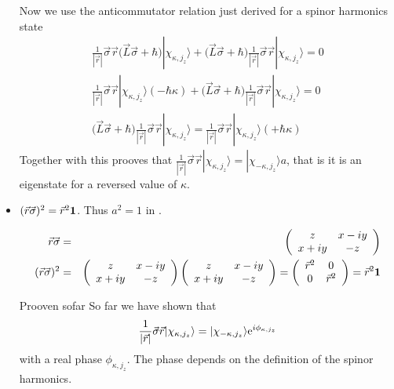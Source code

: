 \documentclass[11pt,a4paper]{report}
\begin{document}
\begin{itemize}
Now we use the anticommutator relation just derived for a spinor
harmonics state
\begin{eqnarray*}
\frac{1}{|\vec{r}|}\vec{\sigma}\vec{r}\biggl(\vec{L}\vec{\sigma}+\hbar\biggr)
|\chi_{\kappa,j_z}\rangle
+\biggl(\vec{L}\vec{\sigma}+\hbar\biggr)\frac{1}{|\vec{r}|}\vec{\sigma}\vec{r}
|\chi_{\kappa,j_z}\rangle
=0
\\
\frac{1}{|\vec{r}|}\vec{\sigma}\vec{r}
|\chi_{\kappa,j_z}\rangle\left(-\hbar\kappa\right)
+\biggl(\vec{L}\vec{\sigma}+\hbar\biggr)\frac{1}{|\vec{r}|}\vec{\sigma}\vec{r}
|\chi_{\kappa,j_z}\rangle
=0
\\
\biggl(\vec{L}\vec{\sigma}+\hbar\biggr)\frac{1}{|\vec{r}|}\vec{\sigma}\vec{r}
|\chi_{\kappa,j_z}\rangle
=\frac{1}{|\vec{r}|}\vec{\sigma}\vec{r}
|\chi_{\kappa,j_z}\rangle\left(+\hbar\kappa\right)
\end{eqnarray*}
Together with  this prooves that
$\frac{1}{|\vec{r}|}\vec{\sigma}\vec{r}
|\chi_{\kappa,j_z}\rangle=|\chi_{-\kappa,j_z}\rangle a$, that is it is
an eigenstate for a reversed value of $\kappa$.

\item $(\vec{r}\vec{\sigma})^2=\vec{r}^2\bm{1}$. Thus $a^2=1$
in . 

\begin{eqnarray*}
\vec{r}\vec{\sigma}&=&
\left(\begin{array}{cc}z&x-iy\\x+iy&-z\end{array}\right)
\\
(\vec{r}\vec{\sigma})^2&=&
\left(\begin{array}{cc}z&x-iy\\x+iy&-z\end{array}\right)
\left(\begin{array}{cc}z&x-iy\\x+iy&-z\end{array}\right)
=
\left(\begin{array}{cc}\vec{r}^2&0\\0&\vec{r}^2\end{array}\right)
=\vec{r}^2\bm{1}
\end{eqnarray*}

\begin{myshadowminipage}{Prooven sofar}
So far we have shown that
\begin{eqnarray*}
\frac{1}{|\vec{r}|}\vec{\sigma}\vec{r}
|\chi_{\kappa,j_z}\rangle=|\chi_{-\kappa,j_z}\rangle \mathrm{e}^{i\phi_{\kappa,j_z}}
\end{eqnarray*}
with a real phase $\phi_{\kappa,j_z}$. The phase depends on the
definition of the spinor harmonics.


\end{myshadowminipage}
\end{itemize}
\end{document}
